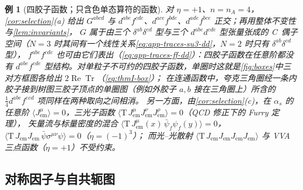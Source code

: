 \documentclass[UTF8,a4paper,11pt,fontset=fandol]{ctexart}
\theoremstyle{cplain}
\theoremstyle{cdefinition}
\newtheorem{example}[theorem]{例}
\theoremstyle{cremark}
\numberwithin{equation}{section}
\DeclareMathOperator{\Tr}{Tr}
\DeclareMathOperator{\Real}{Re}
\begin{document}
\begin{example}[四胶子函数；只含色单态算符的函数]\label{ex:thmII-4g}
对 $\eta=+1$、$n=n_A=4$，\cref{cor:selection}(a) 给出 $G^{abcd}$ 与 $d^{abe}f^{cde}$、$d^{ace}f^{bde}$、$d^{ade}f^{bce}$ 正交；再用整体不变性与\cref{lem:invariants}，
$G$ 属于由三个 $\delta^{ab}\delta^{cd}$ 型与三个 $d^{abe}d^{cde}$ 型张量张成的 C~偶子空间（$N=3$ 时其间有一个线性关系\cref{eq:app-traces-su3-dd}，$N=2$ 时只有 $\delta^{ab}\delta^{cd}$ 型），
$f^{abe}f^{cde}$ 也可由它们表出（\cref{eq:app-traces-ff-dd}）：四胶子函数在任意阶都没有 $d^{abe}f^{cde}$ 型结构。对单粒子不可约的四胶子函数，单圈时这就是\cref{fig:boxes}中三对方框图各给出 $2\Real\Tr$（\cref{eq:thmI-box}）；
在连通函数中，夸克三角圈经一条内胶子接到树图三胶子顶点的单圈图（例如外胶子 $a,b$ 接在三角圈上）所含的 $\frac14d^{abe}f^{ecd}$ 项同样在两种取向之间相消。
另一方面，由\cref{cor:selection}(c)，在 $\alpha_s$ 的任意阶 $\langle J^\mu_{\mathrm{em}}\rangle=0$，三光子函数 $\langle\mathrm T\,J^\mu_{\mathrm{em}}J^\nu_{\mathrm{em}}J^\rho_{\mathrm{em}}\rangle=0$（QCD 修正下的 Furry 定理），
矢量流与标量密度的混合 $\langle\mathrm T\,J^\mu_{\mathrm{em}}(x)\,\bar\psi_f\psi_f(y)\rangle=0$，$\langle\mathrm T\,J_{\mathrm{em}}J_{\mathrm{em}}\,\bar\psi\sigma^{\mu\nu}\psi\rangle=0$（$\eta=(-1)^3$）；
而光--光散射 $\langle\mathrm T\,J_{\mathrm{em}}J_{\mathrm{em}}J_{\mathrm{em}}J_{\mathrm{em}}\rangle$ 与 VVA 三点函数（$\eta=+1$）不受约束。
\end{example}

\subsection{对称因子与自共轭图}\label{sec:thmII-symmetry}
\end{document}
